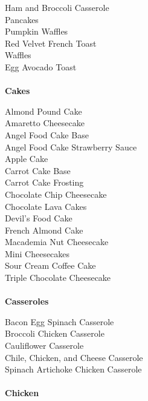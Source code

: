 \documentclass[11pt, twoside, openany]{book}
\begin{document}
Ham and Broccoli Casserole\hrulefill\pageref{ham-and-broccoli-casserole}\\
Pancakes\hrulefill\pageref{pancakes}\\
Pumpkin Waffles\hrulefill\pageref{pumpkin-waffles}\\
Red Velvet French Toast\hrulefill\pageref{red-velvet-french-toast}\\
Waffles\hrulefill\pageref{waffles}\\
Egg Avocado Toast\hrulefill\pageref{egg-avocado-toast}\\
{~\vspace{2mm}\\ \Large \textbf{Cakes}}\hfill\textbf{\pageref{cakes}}

Almond Pound Cake\hrulefill\pageref{almond-pound-cake}\\
Amaretto Cheesecake\hrulefill\pageref{amaretto-cheesecake}\\
Angel Food Cake Base\hrulefill\pageref{angel-food-cake-base}\\
Angel Food Cake Strawberry Sauce\hrulefill\pageref{angel-food-cake-strawberry-sauce}\\
Apple Cake\hrulefill\pageref{apple-cake}\\
Carrot Cake Base\hrulefill\pageref{carrot-cake-base}\\
Carrot Cake Frosting\hrulefill\pageref{carrot-cake-frosting}\\
Chocolate Chip Cheesecake\hrulefill\pageref{chocolate-chip-cheesecake}\\
Chocolate Lava Cakes\hrulefill\pageref{chocolate-lava-cakes}\\
Devil's Food Cake\hrulefill\pageref{devil's-food-cake}\\
French Almond Cake\hrulefill\pageref{french-almond-cake}\\
Macademia Nut Cheesecake\hrulefill\pageref{macademia-nut-cheesecake}\\
Mini Cheesecakes\hrulefill\pageref{mini-cheesecakes}\\
Sour Cream Coffee Cake\hrulefill\pageref{sour-cream-coffee-cake}\\
Triple Chocolate Cheesecake\hrulefill\pageref{triple-chocolate-cheesecake}\\
{~\vspace{2mm}\\ \Large \textbf{Casseroles}}\hfill\textbf{\pageref{casseroles}}

Bacon Egg Spinach Casserole\hrulefill\pageref{bacon-egg-spinach-casserole}\\
Broccoli Chicken Casserole\hrulefill\pageref{broccoli-chicken-casserole}\\
Cauliflower Casserole\hrulefill\pageref{cauliflower-casserole}\\
Chile, Chicken, and Cheese Casserole\hrulefill\pageref{chile,-chicken,-and-cheese-casserole}\\
Spinach Artichoke Chicken Casserole\hrulefill\pageref{spinach-artichoke-chicken-casserole}\\
{~\vspace{2mm}\\ \Large \textbf{Chicken}}\hfill\textbf{\pageref{chicken}}
\end{document}
